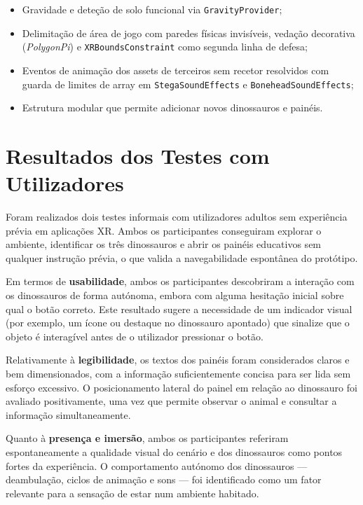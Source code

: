 \documentclass[a4paper,11pt]{report}
\newcommand{\code}[1]{\texttt{#1}}
\begin{document}
\begin{itemize}
          (\code{DinoPanelLookAtPlayer}), eliminando a necessidade de olhar
          para cima;
    \item Gravidade e deteção de solo funcional via \code{GravityProvider};
    \item Delimitação de área de jogo com paredes físicas invisíveis, vedação
          decorativa (\textit{PolygonPi}) e \code{XRBoundsConstraint} como
          segunda linha de defesa;
    \item Eventos de animação dos assets de terceiros sem recetor resolvidos
          com guarda de limites de array em \code{StegaSoundEffects} e
          \code{BoneheadSoundEffects};
    \item Estrutura modular que permite adicionar novos dinossauros e painéis.
\end{itemize}

\section{Resultados dos Testes com Utilizadores}

Foram realizados dois testes informais com utilizadores adultos sem experiência
prévia em aplicações XR. Ambos os participantes conseguiram explorar o ambiente,
identificar os três dinossauros e abrir os painéis educativos sem qualquer
instrução prévia, o que valida a navegabilidade espontânea do protótipo.

Em termos de \textbf{usabilidade}, ambos os participantes descobriram a
interação com os dinossauros de forma autónoma, embora com alguma hesitação
inicial sobre qual o botão correto. Este resultado sugere a necessidade de um
indicador visual (por exemplo, um ícone ou destaque no dinossauro apontado)
que sinalize que o objeto é interagível antes de o utilizador pressionar o botão.

Relativamente à \textbf{legibilidade}, os textos dos painéis foram considerados
claros e bem dimensionados, com a informação suficientemente concisa para ser
lida sem esforço excessivo. O posicionamento lateral do painel em relação ao
dinossauro foi avaliado positivamente, uma vez que permite observar o animal
e consultar a informação simultaneamente.

Quanto à \textbf{presença e imersão}, ambos os participantes referiram
espontaneamente a qualidade visual do cenário e dos dinossauros como pontos
fortes da experiência. O comportamento autónomo dos dinossauros --- deambulação,
ciclos de animação e sons --- foi identificado como um fator relevante para a
sensação de estar num ambiente habitado.
\end{document}
